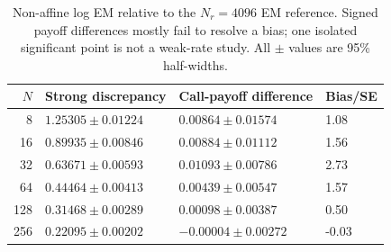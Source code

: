 \begin{table}[H]\centering\small
\caption{Non-affine log EM relative to the $N_r=4096$ EM reference. Signed payoff differences mostly fail to resolve a bias; one isolated significant point is not a weak-rate study. All $\pm$ values are 95\% half-widths.}\label{tab:sv}
\begin{tabular}{rlll}\toprule
$N$ & Strong discrepancy & Call-payoff difference & Bias/SE\\\midrule
8 & $1.25305\pm 0.01224$ & $0.00864\pm 0.01574$ & 1.08\\
16 & $0.89935\pm 0.00846$ & $0.00884\pm 0.01112$ & 1.56\\
32 & $0.63671\pm 0.00593$ & $0.01093\pm 0.00786$ & 2.73\\
64 & $0.44464\pm 0.00413$ & $0.00439\pm 0.00547$ & 1.57\\
128 & $0.31468\pm 0.00289$ & $0.00098\pm 0.00387$ & 0.50\\
256 & $0.22095\pm 0.00202$ & $-0.00004\pm 0.00272$ & -0.03\\
\bottomrule\end{tabular}\end{table}
